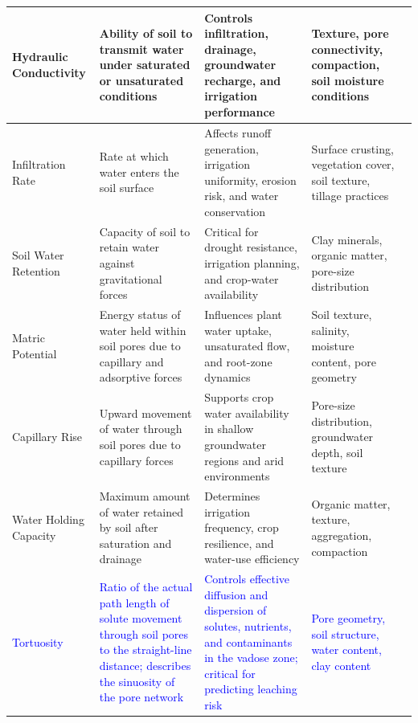 \documentclass[land,article,submit,pdftex,moreauthors]{Definitions/mdpi}
\numberwithin{equation}{section}
\begin{document}
\begin{longtable}{@{\extracolsep{\fill}} p{} p{} p{} p{} p{} @{}}
Hydraulic Conductivity &
Ability of soil to transmit water under saturated or unsaturated conditions &
Controls infiltration, drainage, groundwater recharge, and irrigation performance &
Texture, pore connectivity, compaction, soil moisture conditions &
\citep{Mualem1976, VanGenuchten1980} \\ \hline

Infiltration Rate &
Rate at which water enters the soil surface &
Affects runoff generation, irrigation uniformity, erosion risk, and water conservation &
Surface crusting, vegetation cover, soil texture, tillage practices &
\citep{Assouline2011, Philip1957, Green1911, w10111581} \\ \hline

Soil Water Retention &
Capacity of soil to retain water against gravitational forces &
Critical for drought resistance, irrigation planning, and crop-water availability &
Clay minerals, organic matter, pore-size distribution &
\citep{Gamagedara2025, VanGenuchten1980, Hodnett2002, Vereecken1989} \\ \hline

Matric Potential &
Energy status of water held within soil pores due to capillary and adsorptive forces &
Influences plant water uptake, unsaturated flow, and root-zone dynamics &
Soil texture, salinity, moisture content, pore geometry &
\citep{Gamagedara2025, Richards1931, Dane2002} \\ \hline

Capillary Rise &
Upward movement of water through soil pores due to capillary forces &
Supports crop water availability in shallow groundwater regions and arid environments &
Pore-size distribution, groundwater depth, soil texture &
\citep{hydrology12030055, Gardner1958, ALI2026, app13063374} \\ \hline

Water Holding Capacity &
Maximum amount of water retained by soil after saturation and drainage &
Determines irrigation frequency, crop resilience, and water-use efficiency &
Organic matter, texture, aggregation, compaction &
\citep{Barik2020, flint2018increasing, Hudson1994, Rawls2003} \\ \hline

\textcolor{blue}{Tortuosity} &
\textcolor{blue}{Ratio of the actual path length of solute movement through soil pores to the straight-line distance; describes the sinuosity of the pore network} &
\textcolor{blue}{Controls effective diffusion and dispersion of solutes, nutrients, and contaminants in the vadose zone; critical for predicting leaching risk} &
\textcolor{blue}{Pore geometry, soil structure, water content, clay content} &
\textcolor{blue}{\citep{simunek2008hydrus, vereecken2014soil}} \\ \hline


\end{longtable}
\end{document}
